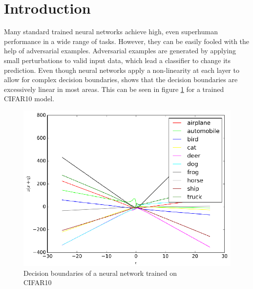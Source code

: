 \documentclass{article}
\begin{document}
\vspace{-0.8cm}

\section{Introduction}
\label{Intro}
Many standard trained neural networks achieve high, even superhuman performance in a wide range of tasks. However, they can be easily fooled with the help of adversarial examples. Adversarial examples are generated by applying small perturbations to valid input data, which lead a classifier to change its prediction. Even though neural networks apply a non-linearity at each layer to allow for complex decision boundaries, \cite{b27} shows that the decision boundaries are excessively linear in most areas. This can be seen in figure \ref{fig1: Decision boundary of a neural network} for a trained CIFAR10 model. \\

\begin{figure}[H]
    \centering
    \vspace{-0.7cm}
    \includegraphics[scale=0.33]{CIFAR10-decision_boundary.png}
    \vspace{-0.35cm}
    \caption{Decision boundaries of a neural network trained on \\ CIFAR10 \cite{b27}}
    \label{fig1: Decision boundary of a neural network}
    \vspace{-0.2cm}
\end{figure}
\end{document}
